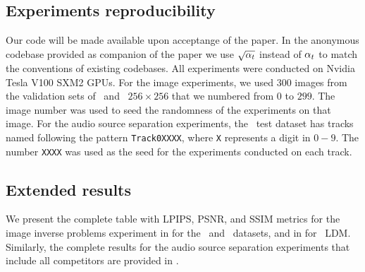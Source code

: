 \subsection{Experiments reproducibility}
Our code will be made available upon acceptange of the paper. In the anonymous codebase provided as companion of the paper we use $\sqrt{\alpha_t}$ instead of $\alpha_t$ to match the conventions of existing codebases.  All experiments were conducted on Nvidia Tesla V100 SXM2 GPUs. 
For the image experiments, we used $300$ images from the validation sets of \ffhq\ and \imagenet\ $256 \times 256$ that we numbered from $0$ to $299$.
The image number was used to seed the randomness of the experiments on that image.
For the audio source separation experiments, the \slakh\ test dataset has tracks named following the pattern \texttt{Track0XXXX}, where \texttt{X} represents a digit in $0-9$.
The number \texttt{XXXX} was used as the seed for the experiments conducted on each track.





\subsection{Extended results}
\label{apdx:extended-results}
We present the complete table with LPIPS, PSNR, and SSIM metrics for the image inverse problems experiment in  for the \ffhq\ and \imagenet\ datasets, and in  for \ffhq\ LDM. Similarly, the complete results for the audio source separation experiments that include all competitors are provided in .

